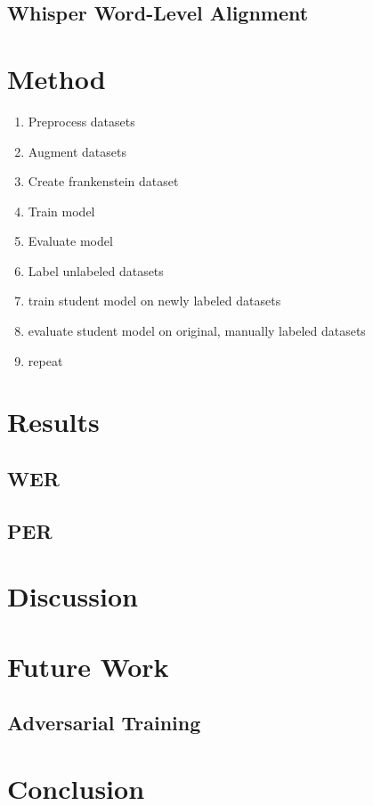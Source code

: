 \documentclass[12pt]{article}
\begin{document}
\begin{multicols*}{2}
\subsection{Whisper Word-Level Alignment}

\section{Method}
\begin{enumerate}
    \item Preprocess datasets
    \item Augment datasets
    \item Create frankenstein dataset
    \item Train model
    \item Evaluate model
    \item Label unlabeled datasets
    \item train student model on newly labeled datasets
    \item evaluate student model on original, manually labeled datasets
    \item repeat
\end{enumerate}

\section{Results}

\subsection{WER}

\subsection{PER}

\section{Discussion}

\section{Future Work}
\subsection{Adversarial Training}

\section{Conclusion}


\end{multicols*}
\end{document}
